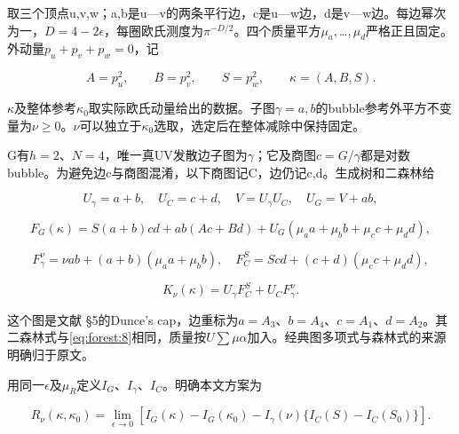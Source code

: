 \documentclass[11pt,a4paper,oneside]{ctexart}
\theoremstyle{cnplain}
\theoremstyle{definition}
\theoremstyle{remark}
\numberwithin{equation}{section}
\begin{document}
取三个顶点u,v,w；a,b是u---v的两条平行边，c是u---w边，d是v---w边。每边幂次为一，\(D=4- 2\epsilon \)，每圈欧氏测度为\(\pi ^{- D/2}\)。四个质量平方\(\mu _a,\)\ldots{}\(,\mu _d\)严格正且固定。外动量\(p_u+p_v+p_w=0\)，记

\begin{equation}
A=p_u^2,\qquad B=p_v^2,\qquad S=p_w^2,
 \qquad \kappa=(A,B,S).
\end{equation}

\(\kappa \)及整体参考\(\kappa _0\)取实际欧氏动量给出的数据。子图\(\gamma ={a,b}\)的bubble参考外平方不变量为\(\nu \ge 0\)。\(\nu \)可以独立于\(\kappa _0\)选取，选定后在整体减除中保持固定。

G有\(h=2\)、\(N=4\)，唯一真UV发散边子图为\(\gamma \)；它及商图\(c=G/\gamma \)都是对数bubble。为避免边c与商图混淆，以下商图记C，边仍记c,d。生成树和二森林给

\begin{equation}
U_\gamma=a+b,\quad U_C=c+d,\quad V=U_\gamma U_C,
 \quad U_G=V+ab,                                                \label{eq:forest:7}
\end{equation}

\begin{equation}
F_G(\kappa)=S(a+b)cd+ab(Ac+Bd)
                +U_G(\mu_a a+\mu_b b+\mu_c c+\mu_d d),           \label{eq:forest:8}
\end{equation}

\begin{equation}
F_\gamma^\nu=\nu ab+(a+b)(\mu_a a+\mu_b b),\quad
 F_C^S=S cd+(c+d)(\mu_c c+\mu_d d),
\end{equation}

\begin{equation}
K_\nu(\kappa)=U_\gamma F_C^S+U_C F_\gamma^\nu.                  \label{eq:forest:9}
\end{equation}

这个图是文献\cite{bk2012} §5的Dunce's cap，边重标为\(a=A_3\)、\(b=A_4\)、\(c=A_1\)、\(d=A_2\)。其二森林式与\eqref{eq:forest:8}相同，质量按\(U\sum \mu \alpha \)加入。经典图多项式与森林式的来源明确归于原文。

用同一\(\epsilon \)及\(\mu _R\)定义\(I_G\)、\(I_\gamma \)、\(I_C\)。明确本文方案为

\begin{equation}
R_\nu(\kappa,\kappa_0)=\lim_{\epsilon\to0}
 \left[I_G(\kappa)-I_G(\kappa_0)
 -I_\gamma(\nu)\{I_C(S)-I_C(S_0)\}\right].                       \label{eq:forest:10}
\end{equation}
\end{document}

